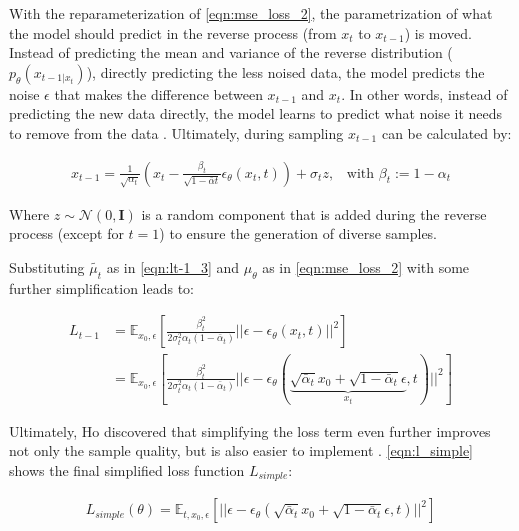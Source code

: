 With the reparameterization of \autoref{eqn:mse_loss_2}, the parametrization of what the model should predict in the reverse process (from $x_t$ to $x_{t-1}$) is moved. 
Instead of predicting the mean and variance of the reverse distribution ($p_\theta(x_{t-1|x_t})$), \ie directly predicting the less noised data, 
the model predicts the noise $\epsilon$ that makes the difference between $x_{t-1}$ and ${x_t}$.
In other words, instead of predicting the new data directly, the model learns to predict what noise it needs to remove from the data \cite{capel2022MasterThesisDenoising}.
Ultimately, during sampling $x_{t-1}$ can be calculated by:

\begin{equation}
  \begin{align*}
    \label{eqn:xt-1}
    x_{t-1} = \frac{1}{\sqrt{\alpha_t}}\left(x_t - \frac{\beta_t}{\sqrt{1-\bar{\alpha}t}}\epsilon_{\theta}(x_t,t)\right) + \sigma_t z \textrm{,}\quad
    \textrm{with } \beta_t := 1-\alpha_t
  \end{align*}
\end{equation}

Where $z\sim\mathcal{N}(0,\textbf{I})$ is a random component that is added during the reverse process (except for $t=1$) to ensure the generation of diverse samples.

Substituting $\tilde{\mu_t}$ as in \autoref{eqn:lt-1_3} and $\mu_\theta$ as in \autoref{eqn:mse_loss_2} with some further simplification leads to:

\begin{equation}
  \begin{align*}
    \label{eqn:eqn:lt-1_4}
    L_{t-1} &= \mathbb{E}_{x_0,\epsilon} \left[  \frac{\beta^2_t}{2\sigma_t^2 \alpha_t (1-\bar{\alpha}_t)} ||\epsilon - \epsilon_\theta(x_t,t)||^2 \right] \\
    &= \mathbb{E}_{x_0,\epsilon} \left[  \frac{\beta^2_t}{2\sigma_t^2 \alpha_t (1-\bar{\alpha}_t)} ||\epsilon - \epsilon_\theta( \underbrace{\sqrt{\bar{\alpha}_t} x_0 + \sqrt{1-\bar{\alpha}_t}\epsilon}_{x_t}, t)||^2 \right]
  \end{align*}
\end{equation}


Ultimately, Ho \etal discovered that simplifying the loss term even further improves not only the sample quality, but is also easier to implement \cite[p. 5]{ho2020DenoisingDiffusionProbabilistic}.
\autoref{eqn:l_simple} shows the final simplified loss function $L_{simple}$:

\begin{equation}
  \begin{align*}
    \label{eqn:l_simple}
    L_{simple}(\theta) = \mathbb{E}_{t, x_0,\epsilon} \left[ ||\epsilon - \epsilon_\theta( \sqrt{\bar{\alpha}_t} x_0 + \sqrt{1-\bar{\alpha}_t}\epsilon, t)||^2 \right]
  \end{align*}
\end{equation}

